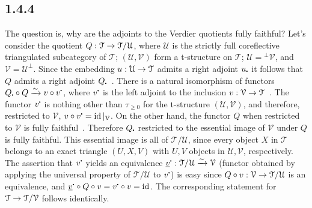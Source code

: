 \documentclass[deligne.tex]{subfiles}
\begin{document}
	\subsection*{1.4.4} The question is, why are the adjoints to the Verdier 
	quotients fully faithful? Let's consider the quotient
	$Q:\mathcal T\rightarrow\mathcal T/\mathcal U$, where $\mathcal U$ is the strictly
	full coreflective triangulated subcategory of $\mathcal T$;
	$(\mathcal U,\mathcal V)$ form a t-structure on $\mathcal T$;
	$\mathcal U={}^\perp\mathcal V$, and $\mathcal V=\mathcal U^\perp$.
	Since the embedding $u:\mathcal U\rightarrow\mathcal T$ admits a right adjoint
	$u_\dotp$ it follows that $Q$ admits a right adjoint $Q_\dotp$~\cite[I 6-5]{CD}.
	There is a natural isomorphism of functors
	$Q_\dotp\circ Q\xrightarrow{\sim}v\circ v^\dotp$,
	where $v^\dotp$ is the left adjoint to the inclusion
	$v:\mathcal V\rightarrow\mathcal T$~\cite[I 6-6]{CD}.
	The functor $v^\dotp$ is nothing other
	than $\tau_{\geq0}$ for the t-structure $(\mathcal U,\mathcal V)$,
	and therefore, restricted to $\mathcal V$,
	$v\circ v^\dotp=\id|_{\mathcal V}$.
	On the other hand, the functor $Q$ when restricted to $\mathcal V$
	is fully faithful~\cite[I 5-3]{CD}. Therefore $Q_\dotp$ restricted to the
	essential image of $\mathcal V$ under $Q$ is fully faithful.
	This essential image is all of $\mathcal T/\mathcal U$, since every object
	$X$ in $\mathcal T$ belongs to an exact triangle $(U,X,V)$ with $U,V$
	objects in $\mathcal U,\mathcal V$, respectively.
	The assertion that $v^\dotp$ yields an equivalence
	$\underline v^\dotp:\mathcal T/\mathcal U\xrightarrow{\sim}\mathcal V$
	(functor obtained by
	applying the universal property of $\mathcal T/\mathcal U$ to $v^\dotp$) 
	is easy since $Q\circ v:\mathcal V\rightarrow\mathcal T/\mathcal U$ is an 
	equivalence, and $\underline v^\dotp\circ Q\circ v=v^\dotp\circ v=\id$.
	The corresponding
	statement for $\mathcal T\rightarrow\mathcal T/\mathcal V$ follows identically.
	
\end{document}
